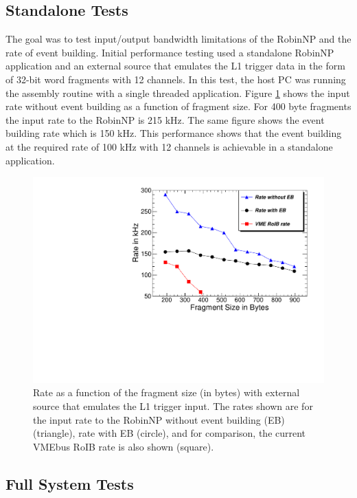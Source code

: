 \subsection{Standalone Tests}\label{sec:perf_alone}

The goal was to test input/output bandwidth limitations of the RobinNP and the rate of event building. Initial performance testing used 
a standalone RobinNP application and an external source that emulates the L1 trigger data 
in the form of 32-bit word fragments with 12 channels. In this test, the host PC was running the assembly routine with a single threaded application.  Figure \ref{fig:cern_robinnproib} shows the input rate without 
event building as a function of fragment size. For 400 byte fragments the input rate to the RobinNP is 215 kHz. 
The same figure 
shows the event building rate which is 150 kHz. This performance shows that the event building 
at the required rate of 100 kHz with 12 channels is achievable in a standalone application.  


\begin{figure}[tbp] %
\centering
\includegraphics[width=.7\textwidth]{cern_robinnproib.pdf}
\caption{Rate as a function of the fragment size (in bytes) with external source that emulates the L1 trigger input. 
The rates shown are for the input rate to the RobinNP without event building (EB) (triangle), rate with EB (circle), and 
for comparison, the current VMEbus RoIB rate is also shown (square).  }
\label{fig:cern_robinnproib}
\end{figure}


\subsection{Full System Tests}\label{sec:perf_tdaq}

